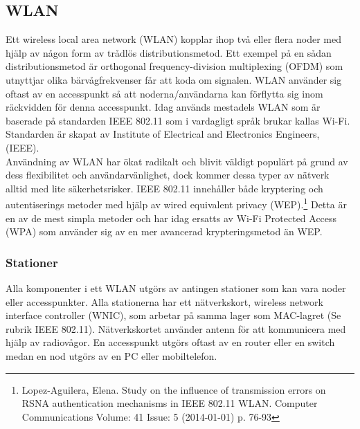 \documentclass[a4paper,12pt,fleqn]{article}
\begin{document}
\subsection{WLAN}
Ett wireless local area network (WLAN) kopplar ihop två eller flera noder med hjälp av någon form av trådlös distributionsmetod. Ett exempel på en sådan distributionsmetod är orthogonal frequency-division multiplexing (OFDM) som utnyttjar olika bärvågfrekvenser får att koda om signalen. WLAN använder sig oftast av en accesspunkt så att noderna/användarna kan förflytta sig inom räckvidden för denna accesspunkt. Idag används mestadels WLAN som är baserade på standarden IEEE 802.11 som i vardagligt språk brukar kallas Wi-Fi. Standarden är skapat av Institute of Electrical and Electronics Engineers, (IEEE). \\
Användning av WLAN har ökat radikalt och blivit väldigt populärt på grund av dess flexibilitet och användarvänlighet, dock kommer dessa typer av nätverk alltid med lite säkerhetsrisker. IEEE 802.11 innehåller både kryptering och autentiserings metoder med hjälp av wired equivalent privacy (WEP).\footnote{Lopez-Aguilera, Elena. Study on the influence of transmission errors on RSNA authentication mechanisms in IEEE 802.11 WLAN. Computer Communications Volume: 41 Issue: 5 (2014-01-01) p. 76-93} Detta är en av de mest simpla metoder och har idag ersatts av  Wi-Fi Protected Access (WPA) som använder sig av en mer avancerad krypteringsmetod än WEP.

\subsubsection{Stationer}
Alla komponenter i ett WLAN utgörs av antingen stationer som kan vara noder eller accesspunkter. Alla stationerna har ett nätverkskort, wireless network interface controller (WNIC), som arbetar på samma lager som MAC-lagret (Se rubrik IEEE 802.11). Nätverkskortet använder antenn för att kommunicera med hjälp av radiovågor. En accesspunkt utgörs oftast av en router eller en switch medan en nod utgörs av en PC eller mobiltelefon.
\end{document}

